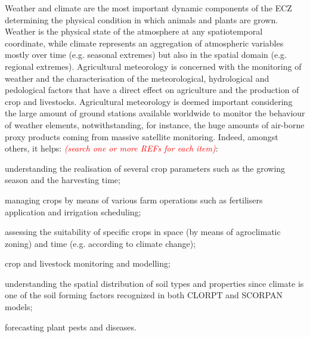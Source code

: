 \documentclass[authoryear,preprint,review,12pt]{elsarticle}
\newcommand{\note}[1]{\emph{\textcolor{red}{#1}}}
\begin{document}


Weather and climate are the most important dynamic components of the ECZ determining the physical condition in which animals and plants are grown.
Weather is the physical state of the atmosphere at any spatiotemporal coordinate, while climate represents an aggregation of atmospheric variables mostly over time (e.g. seasonal extremes) but also in the spatial domain (e.g. regional extremes).
Agricultural meteorology is concerned with the monitoring of weather and the characterisation of the meteorological, hydrological and pedological factors that have a direct effect on agriculture and the production of crop and livestocks.
Agricultural meteorology is deemed important considering the large amount of ground stations available worldwide to monitor the behaviour of weather elements, notwithstanding, for instance, the huge amounts of air-borne proxy products coming from massive satellite monitoring.
Indeed, amongst others, it helps: \note{(search one or more REFs for each item)}: 
    \begin{enumerate*}
        \item understanding the realisation of several crop parameters such as the growing season and the harvesting time;  %
        \item managing crops by means of various farm operations such as fertilisers application and irrigation scheduling;
        \item assessing the suitability of specific crops in space (by means of agroclimatic zoning) and time (e.g. according to climate change);
        \item crop and livestock monitoring and modelling;
        \item understanding the spatial distribution of soil types and properties since climate is one of the soil forming factors recognized in both CLORPT \citep{jenny:clorpt:1941} and SCORPAN \citep{McBratney:scorpan:2003} models;
        \item forecasting plant pests and diseases.
    \end{enumerate*}
\end{document}
